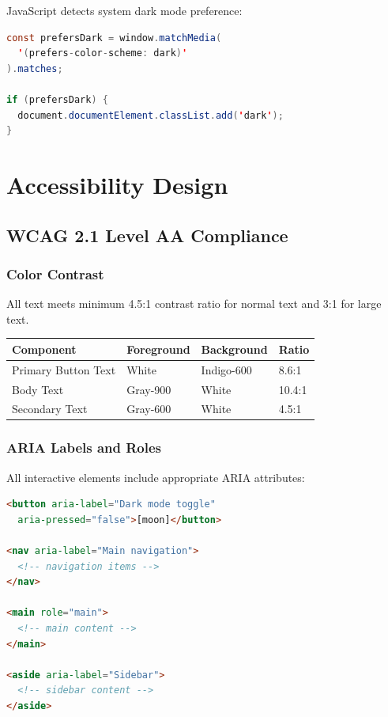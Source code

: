 \documentclass{report}
\begin{document}
JavaScript detects system dark mode preference:

\begin{lstlisting}[language=Java]
const prefersDark = window.matchMedia(
  '(prefers-color-scheme: dark)'
).matches;

if (prefersDark) {
  document.documentElement.classList.add('dark');
}
\end{lstlisting}

\chapter{Accessibility Design}

\section{WCAG 2.1 Level AA Compliance}

\subsection{Color Contrast}

All text meets minimum 4.5:1 contrast ratio for normal text and 3:1 for large text.

\begin{table}[h]
\centering
\begin{tabular}{|l|l|l|l|}
\hline
\textbf{Component} & \textbf{Foreground} & \textbf{Background} & \textbf{Ratio} \\
\hline
Primary Button Text & White & Indigo-600 & 8.6:1 \\
\hline
Body Text & Gray-900 & White & 10.4:1 \\
\hline
Secondary Text & Gray-600 & White & 4.5:1 \\
\hline
\end{tabular}
\end{table}

\subsection{ARIA Labels and Roles}

All interactive elements include appropriate ARIA attributes:

\begin{lstlisting}[language=HTML]
<button aria-label="Dark mode toggle" 
  aria-pressed="false">[moon]</button>

<nav aria-label="Main navigation">
  <!-- navigation items -->
</nav>

<main role="main">
  <!-- main content -->
</main>

<aside aria-label="Sidebar">
  <!-- sidebar content -->
</aside>
\end{lstlisting}
\end{document}
